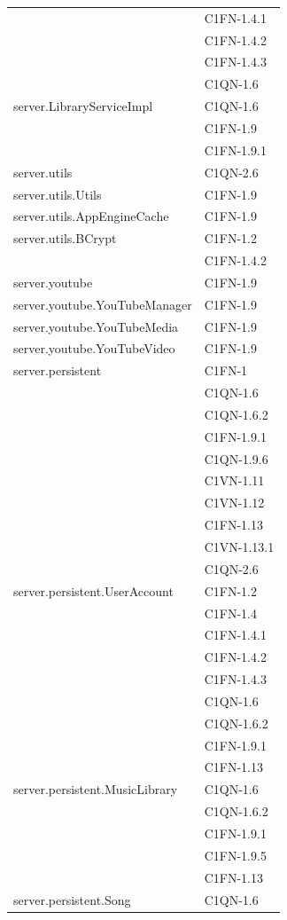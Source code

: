 \begin{footnotesize}
\begin{longtable}[!h]{|l|l|}
& C1FN-1.4.1\\
& C1FN-1.4.2\\
& C1FN-1.4.3\\
& C1QN-1.6\\\hline 
server.LibraryServiceImpl  &  C1QN-1.6 \\
& C1FN-1.9\\
& C1FN-1.9.1\\\hline 
server.utils  &  C1QN-2.6 \\\hline  
server.utils.Utils  & C1FN-1.9\\\hline  
server.utils.AppEngineCache  &  C1FN-1.9\\\hline
server.utils.BCrypt  &  C1FN-1.2 \\
& C1FN-1.4.2\\\hline
server.youtube  &  C1FN-1.9\\\hline
server.youtube.YouTubeManager  &  C1FN-1.9 \\\hline
server.youtube.YouTubeMedia  &  C1FN-1.9 \\\hline
server.youtube.YouTubeVideo  &  C1FN-1.9 \\\hline
server.persistent  &  C1FN-1 \\
& C1QN-1.6\\
& C1QN-1.6.2\\
& C1FN-1.9.1\\
& C1QN-1.9.6\\
& C1VN-1.11\\
& C1VN-1.12\\
& C1FN-1.13\\
& C1VN-1.13.1\\
& C1QN-2.6\\\hline 
server.persistent.UserAccount  &  C1FN-1.2\\
& C1FN-1.4\\
& C1FN-1.4.1\\
& C1FN-1.4.2\\
& C1FN-1.4.3\\
& C1QN-1.6\\
& C1QN-1.6.2\\ 
& C1FN-1.9.1\\
& C1FN-1.13\\\hline 
server.persistent.MusicLibrary  & C1QN-1.6\\
& C1QN-1.6.2\\
& C1FN-1.9.1\\\
& C1FN-1.9.5\\
& C1FN-1.13\\\hline 
server.persistent.Song  & C1QN-1.6\\

\end{longtable}
\end{footnotesize}
